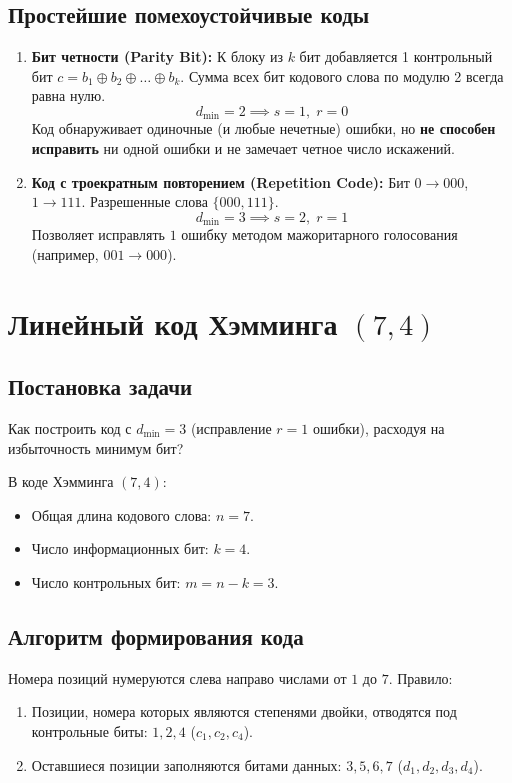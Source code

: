 \documentclass[11pt,a4paper]{article}
\begin{document}
\subsection{Простейшие помехоустойчивые коды}
\begin{enumerate}
    \item \textbf{Бит четности (Parity Bit):} К блоку из $k$ бит добавляется 1 контрольный бит $c = b_1 \oplus b_2 \oplus \dots \oplus b_k$. Сумма всех бит кодового слова по модулю 2 всегда равна нулю. 
    $$d_{\min} = 2 \implies s = 1, \; r = 0$$
    Код обнаруживает одиночные (и любые нечетные) ошибки, но \textbf{не способен исправить} ни одной ошибки и не замечает четное число искажений.
    \item \textbf{Код с троекратным повторением (Repetition Code):} Бит $0 \to 000$, $1 \to 111$. Разрешенные слова $\{000, 111\}$. 
    $$d_{\min} = 3 \implies s = 2, \; r = 1$$
    Позволяет исправлять $1$ ошибку методом мажоритарного голосования (например, $001 \to 000$).
\end{enumerate}

\section{Линейный код Хэмминга $(7, 4)$}

\subsection{Постановка задачи}
Как построить код с $d_{\min} = 3$ (исправление $r = 1$ ошибки), расходуя на избыточность минимум бит? 

В коде Хэмминга $(7, 4)$:
\begin{itemize}
    \item Общая длина кодового слова: $n = 7$.
    \item Число информационных бит: $k = 4$.
    \item Число контрольных бит: $m = n - k = 3$.
\end{itemize}

\subsection{Алгоритм формирования кода}
Номера позиций нумеруются слева направо числами от $1$ до $7$. 
Правило:
\begin{enumerate}
    \item Позиции, номера которых являются степенями двойки, отводятся под контрольные биты: $1, 2, 4$ ($c_1, c_2, c_4$).
    \item Оставшиеся позиции заполняются битами данных: $3, 5, 6, 7$ ($d_1, d_2, d_3, d_4$).
\end{enumerate}
\end{document}
